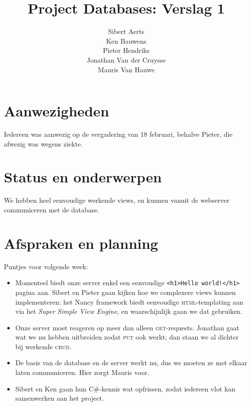 \documentclass[10pt,a4paper]{article}
\author{Sibert Aerts\\
Ken Bauwens\\
Pieter Hendriks\\
Jonathan Van der Cruysse\\
Mauris Van Hauwe}
\title{Project Databases: Verslag 1}
\begin{document}
  \maketitle
  \section{Aanwezigheden}
  Iedereen was aanwezig op de vergadering van 18 februari, behalve Pieter, die 
  afwezig was wegens ziekte.
  
  \section{Status en onderwerpen}
  We hebben heel eenvoudige werkende views, en kunnen vanuit de webserver 
  communiceren met de database.
  
  \section{Afspraken en planning}
  Puntjes voor volgende week:
  \begin{itemize}
    \item Momenteel biedt onze server enkel een eenvoudige \texttt{<h1>Hello 
    world!</h1>} pagina aan. Sibert en Pieter gaan kijken hoe we complexere 
    views kunnen implementeren: het Nancy framework biedt eenvoudige 
    \textsc{html}-templating aan 
    via het \textit{Super Simple View Engine}, en waarschijnlijk gaan we dat 
    gebruiken.
    \item Onze server moet reageren op meer dan alleen 
    \textsc{get}-requests. Jonathan gaat wat we nu hebben uitbreiden zodat 
    \textsc{put} ook werkt; dan staan we al dichter bij werkende \textsc{crud}.
    \item De basis van de database en de server werkt nu, dus we moeten ze met 
    elkaar laten communiceren. Hier zorgt Mauris voor.
    \item Sibert en Ken gaan hun C\#-kennis wat opfrissen, zodat iedereen vlot 
    kan samenwerken aan het project.
  \end{itemize}
\end{document}
